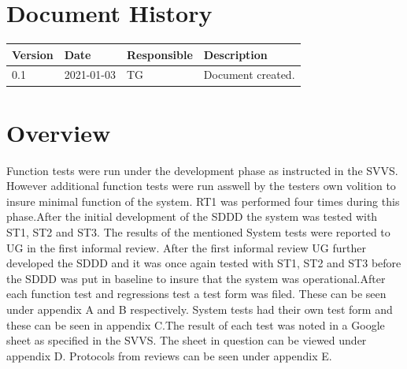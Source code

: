 \documentclass{article}
\date {#1}
\title {
    \documentNumber {06}    
    
    \documentVersion {0.1}
    
    \documentTitle {Software Verification and Validation Report}
    \documentGroup {2}
    
    \documentResponsible {Test Group}
    \documentAuthors {Test Group}
    
    \documentDate {2021-03-03}
}
\begin{document}
\maketitle
\thispagestyle{empty}

\newpage

\tableofcontents

\newpage


\section{Document History}
\begin{tabular}{ l | l | l | l }
    Version & Date & Responsible & Description \\
    \hline
  	0.1 & 2021-01-03 & TG & Document created. \\
\end{tabular}

\section{Overview}
Function tests were run under the development phase as instructed in the SVVS. However additional function tests were run asswell by the testers own volition to insure minimal function of the system. RT1 was performed four times during this phase.\newline \newline After the initial development of the SDDD the system was tested with ST1, ST2 and ST3. The results of the mentioned System tests were reported to UG in the first informal review. After the first informal review UG further developed the SDDD and it was once again tested with ST1, ST2 and ST3 before the SDDD was put in baseline to insure that the system was operational.\newline \newline After each function test and regressions test a test form was filed. These can be seen under appendix A and B respectively.  System tests had their own test form and these can be seen in appendix C.The result of each test was noted in a Google sheet as specified in the SVVS. The sheet in question can be viewed under appendix D. Protocols from reviews can be seen under appendix E. 
\end{document}
